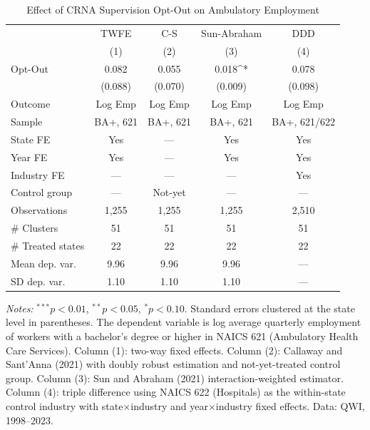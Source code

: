 
\begin{table}[htbp]
\centering
\caption{Effect of CRNA Supervision Opt-Out on Ambulatory Employment}
\label{tab:main}
\begin{threeparttable}
\begin{tabular}{lcccc}
\toprule
 & TWFE & C-S & Sun-Abraham & DDD \\
 & (1) & (2) & (3) & (4) \\
\midrule
Opt-Out & 0.082 & 0.055 & 0.018^{*} & 0.078 \\
 & (0.088) & (0.070) & (0.009) & (0.098) \\
\addlinespace
Outcome & Log Emp & Log Emp & Log Emp & Log Emp \\
Sample & BA+, 621 & BA+, 621 & BA+, 621 & BA+, 621/622 \\
State FE & Yes & --- & Yes & Yes \\
Year FE & Yes & --- & Yes & Yes \\
Industry FE & --- & --- & --- & Yes \\
Control group & --- & Not-yet & --- & --- \\
Observations & 1,255 & 1,255 & 1,255 & 2,510 \\
\# Clusters & 51 & 51 & 51 & 51 \\
\# Treated states & 22 & 22 & 22 & 22 \\
Mean dep. var. & 9.96 & 9.96 & 9.96 & --- \\
SD dep. var. & 1.10 & 1.10 & 1.10 & --- \\
\bottomrule
\end{tabular}
\begin{tablenotes}[flushleft]
\small
\item \textit{Notes:} $^{***}p<0.01$, $^{**}p<0.05$, $^{*}p<0.10$. Standard errors clustered at the state level in parentheses. The dependent variable is log average quarterly employment of workers with a bachelor's degree or higher in NAICS 621 (Ambulatory Health Care Services). Column (1): two-way fixed effects. Column (2): Callaway and Sant'Anna (2021) with doubly robust estimation and not-yet-treated control group. Column (3): Sun and Abraham (2021) interaction-weighted estimator. Column (4): triple difference using NAICS 622 (Hospitals) as the within-state control industry with state$\times$industry and year$\times$industry fixed effects. Data: QWI, 1998--2023.
\end{tablenotes}
\end{threeparttable}
\end{table}

